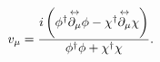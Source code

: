 \begin{equation}
v_\mu = { i\left(
\phi^\dagger \overset{\leftrightarrow}{\partial_\mu}\phi 
 -\chi^\dagger \overset{\leftrightarrow}{\partial_\mu}\chi 
\right)  
\over \phi^\dagger \phi + \chi^\dagger \chi}.  
  \label{U(1)quotient}
\end{equation}

